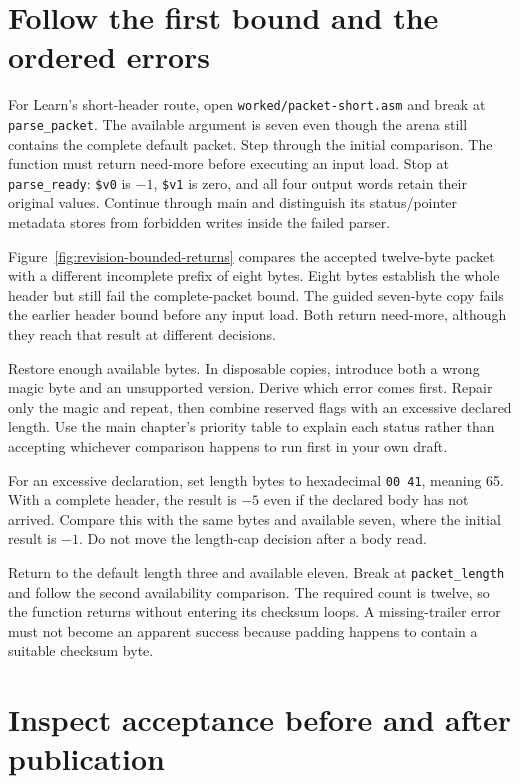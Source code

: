 \section{Follow the first bound and the ordered errors}

For Learn's short-header route, open \texttt{worked/packet-short.asm} and
break at \texttt{parse\_packet}. The available argument is seven even though
the arena still contains the complete default packet. Step through the initial
comparison. The function must return need-more before
executing an input load. Stop at \texttt{parse\_ready}: \texttt{\$v0} is $-1$,
\texttt{\$v1} is zero, and all four output words retain their original values.
Continue through main and distinguish its status/pointer metadata stores from
forbidden writes inside the failed parser.

Figure~\ref{fig:revision-bounded-returns} compares the accepted twelve-byte
packet with a different incomplete prefix of eight bytes. Eight bytes establish
the whole header but still fail the complete-packet bound. The guided seven-byte
copy fails the earlier header bound before any input load. Both return
need-more, although they reach that result at different decisions.



Restore enough available bytes. In disposable copies, introduce both a wrong
magic byte and an unsupported version. Derive which error comes first. Repair
only the magic and repeat, then combine reserved flags with an excessive declared
length. Use the main chapter's priority table to explain each status rather than
accepting whichever comparison happens to run first in your own draft.

For an excessive declaration, set length bytes to hexadecimal \texttt{00 41},
meaning 65. With a complete header, the result is $-5$ even if the declared body
has not arrived. Compare this with the same bytes and available seven, where the
initial result is $-1$. Do not move the length-cap decision after a body read.

Return to the default length three and available eleven. Break at
\texttt{packet\_length} and follow the second availability comparison. The required
count is twelve, so the function returns without entering its checksum loops.
A missing-trailer error must not become an apparent success because padding
happens to contain a suitable checksum byte.

\section{Inspect acceptance before and after publication}

